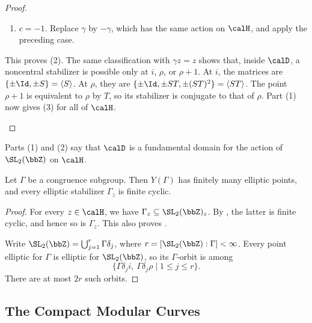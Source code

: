 \begin{proof}
\begin{enumerate}
\begin{enumerate}[label=\textit{Case~\arabic*.}]
            If $z = \rho$ and $d = 1$, then $a - b = 1$ and
            \[
                \gamma\rho = a - \frac{1}{\rho + 1} = a + \rho.
            \]
            Hence $a = 0, 1$. Similarly, for $z = \rho + 1$ and $d = -1$, we obtain $\gamma z = a + z$ with $a = 0, -1$. These again give a fixed endpoint or the identification of the two endpoints.
            \item $c = -1$.
            Replace $\gamma$ by $-\gamma$, which has the same action on $\calH$, and apply the preceding case.
        \end{enumerate}
        This proves (2). The same classification with $\gamma z = z$ shows that, inside $\calD$, a noncentral stabilizer is possible only at $i$, $\rho$, or $\rho + 1$. At $i$, the matrices are $\{\pm\Id, \pm S\} = \langle S\rangle$. At $\rho$, they are $\{\pm\Id, \pm ST, \pm(ST)^2\} = \langle ST\rangle$. The point $\rho + 1$ is equivalent to $\rho$ by $T$, so its stabilizer is conjugate to that of $\rho$. Part (1) now gives (3) for all of $\calH$.
    \end{enumerate}
\end{proof}

\begin{remark}
    Parts (1) and (2) say that $\calD$ is a fundamental domain for the action of $\SL_2(\bbZ)$ on $\calH$.
\end{remark}

\begin{corollary}\label{Cor:MF_finite_elliptic_points}
    Let $\Gamma$ be a congruence subgroup. Then $Y(\Gamma)$ has finitely many elliptic points, and every elliptic stabilizer $\Gamma_z$ is finite cyclic.
\end{corollary}

\begin{proof}
    For every $z \in \calH$, we have $\Gamma_z \subseteq \SL_2(\bbZ)_z$. By , the latter is finite cyclic, and hence so is $\Gamma_z$. This also proves .

    Write $\SL_2(\bbZ) = \bigcup_{j=1}^r\Gamma\delta_j$, where $r = [\SL_2(\bbZ) : \Gamma] < \infty$. Every point elliptic for $\Gamma$ is elliptic for $\SL_2(\bbZ)$, so its $\Gamma$-orbit is among
    \[
        \{\Gamma\delta_j i,\ \Gamma\delta_j\rho \mid 1 \le j \le r\}.
    \]
    There are at most $2r$ such orbits.
\end{proof}

\subsection{The Compact Modular Curves}\label{Sec:MF_compact_modular_curves}


